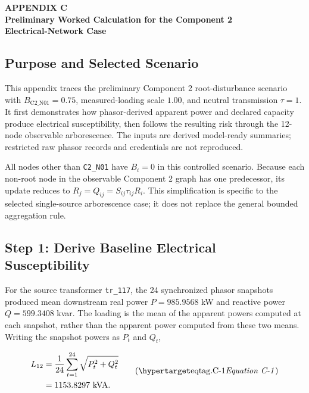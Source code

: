 \clearpage
\thispagestyle{empty}
\label{app:electrical-worked-example}

{
\centering
\textbf{APPENDIX C}\\
\textbf{Preliminary Worked Calculation for the Component 2\\
Electrical-Network Case}\par
}
\vspace{\baselineskip}

\subsection{Purpose and Selected Scenario}

This appendix traces the preliminary Component 2 root-disturbance scenario with
\(B_{\mathrm{C2\_N01}}=0.75\), measured-loading scale \(1.00\), and neutral
transmission \(\tau=1\). It first demonstrates how phasor-derived apparent
power and declared capacity produce electrical susceptibility, then follows
the resulting risk through the 12-node observable arborescence. The inputs are
derived model-ready summaries; restricted raw phasor records and credentials
are not reproduced.

All nodes other than \texttt{C2\_N01} have \(B_i=0\) in this controlled
scenario. Because each non-root node in the observable Component 2 graph has
one predecessor, its update reduces to \(R_j=Q_{ij}=S_{ij}\tau_{ij}R_i\).
This simplification is specific to the selected single-source arborescence
case; it does not replace the general bounded aggregation rule.

\subsection{Step 1: Derive Baseline Electrical Susceptibility}

For the source transformer \texttt{tr\_117}, the 24 synchronized phasor
snapshots produced mean downstream real power \(P=985.9568\) kW and reactive
power \(Q=599.3408\) kvar. The loading is the mean of the apparent
powers computed at each snapshot, rather than the apparent power computed
from these two means. Writing the snapshot powers as \(P_t\) and \(Q_t\),

\[
\begin{aligned}
L_{12}
 &=\frac{1}{24}\sum_{t=1}^{24}\sqrt{P_t^2+Q_t^2}\\
 &=1153.8297\ \text{kVA}.
\end{aligned}
\eqtag{C-1}
\]

